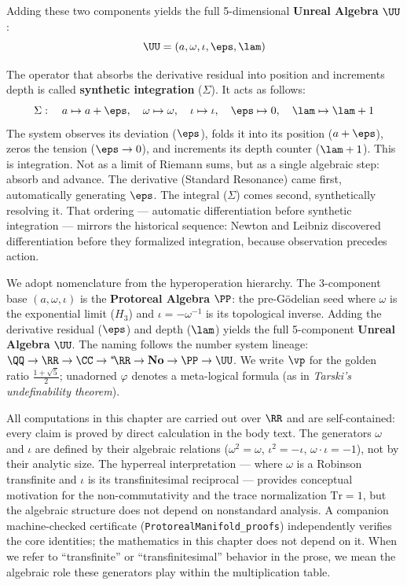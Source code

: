 Adding these two components yields the full 5-dimensional \textbf{Unreal Algebra} $\UU$:
$$\UU = (a, \omega, \iota, \eps, \lam)$$

The operator that absorbs the derivative residual into position and increments depth is called \textbf{synthetic integration} ($\Sigma$). It acts as follows:
$$\Sigma: \quad a \mapsto a + \eps, \quad \omega \mapsto \omega, \quad \iota \mapsto \iota, \quad \eps \mapsto 0, \quad \lam \mapsto \lam + 1$$
The system observes its deviation ($\eps$), folds it into its position ($a + \eps$), zeros the tension ($\eps \to 0$), and increments its depth counter ($\lam + 1$). This is integration. Not as a limit of Riemann sums, but as a single algebraic step: absorb and advance. The derivative (Standard Resonance) came first, automatically generating $\eps$. The integral ($\Sigma$) comes second, synthetically resolving it. That ordering --- automatic differentiation before synthetic integration --- mirrors the historical sequence: Newton and Leibniz discovered differentiation before they formalized integration, because observation precedes action.

\begin{remark}\label{rem:hyper-tower}
We adopt nomenclature from the hyperoperation hierarchy. The 3-component base $(a, \omega, \iota)$ is the \textbf{Protoreal Algebra} $\PP$: the pre-G\"odelian seed where $\omega$ is the exponential limit ($H_3$) and $\iota = -\omega^{-1}$ is its topological inverse. Adding the derivative residual ($\eps$) and depth ($\lam$) yields the full 5-component \textbf{Unreal Algebra} $\UU$. The naming follows the number system lineage: $\QQ \to \RR \to \CC \to {}^*\!\RR \to \mathbf{No} \to \PP \to \UU$. We write $\vp$ for the golden ratio $\tfrac{1+\sqrt{5}}{2}$; unadorned $\varphi$ denotes a meta-logical formula (as in \emph{Tarski's undefinability theorem}).
\end{remark}

\begin{remark}\label{rem:convention}
All computations in this chapter are carried out over $\RR$ and are
self-contained: every claim is proved by direct calculation in the body
text. The generators $\omega$ and $\iota$ are defined by their algebraic
relations ($\omega^2 = \omega$, $\iota^2 = -\iota$,
$\omega \cdot \iota = -1$), not by their analytic size. The hyperreal
interpretation --- where $\omega$ is a Robinson transfinite and $\iota$
is its transfinitesimal reciprocal --- provides conceptual motivation
for the non-commutativity and the trace normalization $\mathrm{Tr} = 1$,
but the algebraic structure does not depend on nonstandard analysis.
A companion machine-checked certificate
(\texttt{ProtorealManifold\_proofs}) independently verifies the
core identities; the mathematics in this chapter does not depend on it.
When we refer to ``transfinite'' or ``transfinitesimal'' behavior in the
prose, we mean the algebraic role these generators play within the
multiplication table.
\end{remark}

